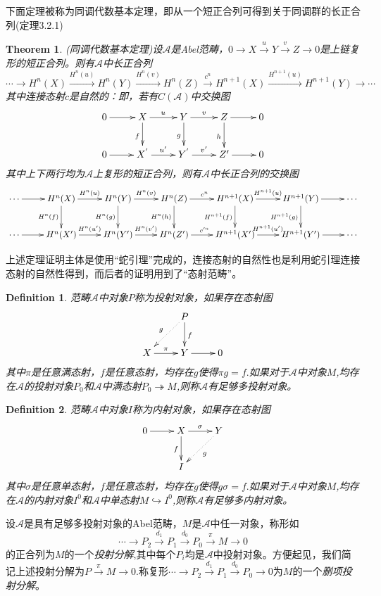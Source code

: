 \documentclass[UTF8]{article}
\newtheorem{thm}{Theorem}[section]
\newtheorem{defn}{Definition}[section]
\begin{document}
下面定理被称为同调代数基本定理，即从一个短正合列可得到关于同调群的长正合列(\cite{zh}定理3.2.1)	
\begin{thm}
(同调代数基本定理)设$\mathcal{A}$是Abel范畴，$0\rightarrow X\stackrel{u}{\rightarrow}
 Y\stackrel{v}{\rightarrow} Z\rightarrow 0$是上链复形的短正合列。则有$\mathcal{A}$中长正合列
 $$
 \cdots\rightarrow H^{n}(X)\stackrel{H^{n}(u)}{\longrightarrow}H^{n}(Y)\stackrel{H^{n}(v)}{\longrightarrow}H^{n}(Z)\stackrel{c^{n}}{\longrightarrow}H^{n+1}(X)\stackrel{H^{n+1}(u)}{\longrightarrow}H^{n+1}(Y)\longrightarrow\cdots
 $$
 其中连接态射$c$是自然的：即，若有$C(\mathcal{A})$中交换图
 $$
 \xymatrix{
0\ar[r]&X\ar[r]^{u}\ar[d]_{f}&Y\ar[r]^{v}\ar[d]_{g}&Z\ar[r]\ar[d]_{h}&0 \\
0\ar[r]&X^{'}\ar[r]^{u'}&Y^{'}\ar[r]^{v'}&Z'\ar[r]&0 
}
 $$
 其中上下两行均为$\mathcal{A}$上复形的短正合列，则有$\mathcal{A}$中长正合列的交换图
 $$
 \xymatrix{
 \cdots\ar[r]& H^{n}(X)\ar[r]^{H^{n}(u)}\ar[d]_{H^{n}(f)}&H^{n}(Y)\ar[r]^{H^{n}(v)}\ar[d]_{H^{n}(g)}&H^{n}(Z)\ar[r]^{c^{n}}\ar[d]_{H^{n}(h)}&H^{n+1}(X)\ar[r]^{H^{n+1}(u)}\ar[d]_{H^{n+1}(f)}&H^{n+1}(Y)\ar[r]\ar[d]_{H^{n+1}(g)}&\cdots \\
 \cdots\ar[r]& H^{n}(X')\ar[r]^{H^{n}(u')}&H^{n}(Y')\ar[r]^{H^{n}(v')}&H^{n}(Z')\ar[r]^{c'^{n}}&H^{n+1}(X')\ar[r]^{H^{n+1}(u')}&H^{n+1}(Y')\ar[r]&\cdots
}
 $$
\end{thm}
上述定理证明主体是使用“蛇引理”完成的，连接态射的自然性也是利用蛇引理连接态射的自然性得到，而后者的证明用到了“态射范畴”。
\begin{defn}
范畴$\mathcal{A}$中对象$P$称为投射对象，如果存在态射图
$$
\xymatrix{
&P\ar[d]^{f}\ar@{.>}[ld]_{g}& \\
X\ar[r]^{\pi}&Y\ar[r]&0
}
$$
其中$\pi$是任意满态射，$f$是任意态射，均存在$g$使得$\pi g=f.$如果对于$\mathcal{A}$中对象$M$,均存在$\mathcal{A}$的投射对象$P_{0}$和$\mathcal{A}$中满态射$P_{0}\twoheadrightarrow M$,则称$\mathcal{A}$有足够多投射对象。
\end{defn}

\begin{defn}
	范畴$\mathcal{A}$中对象$I$称为内射对象，如果存在态射图
	$$
	\xymatrix{
		0\ar[r]&X\ar[r]^{\sigma}\ar[d]_{f}&Y\ar@{.>}[ld]^{g}\\
		&I&
	}
	$$
	其中$\sigma$是任意单态射，$f$是任意态射，均存在$g$使得$g\sigma =f.$如果对于$\mathcal{A}$中对象$M$,均存在$\mathcal{A}$的内射对象$I^{0}$和$\mathcal{A}$中单态射$M \hookrightarrow I^{0}$,则称$\mathcal{A}$有足够多内射对象。
\end{defn}

设$\mathcal{A}$是具有足够多投射对象的Abel范畴，$M$是$\mathcal{A}$中任一对象，称形如
$$
\cdots\rightarrow P_{2}\stackrel{d_{1}}{\rightarrow}P_{1}\stackrel{d_{0}}{\rightarrow}P_{0}\stackrel{\pi}{\rightarrow}M\rightarrow 0
$$
的正合列为$M$的一个\emph{投射分解},其中每个$P_{i}$均是$\mathcal{A}$中投射对象。方便起见，我们简记上述投射分解为$P\stackrel{\pi}{\rightarrow}M\rightarrow 0$.称复形$\cdots\rightarrow P_{2}\stackrel{d_{1}}{\rightarrow}P_{1}\stackrel{d_{0}}{\rightarrow}P_{0}\rightarrow 0$为$M$的一个\emph{删项投射分解}。
\end{document}
